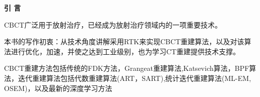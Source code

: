 
\newpage

\textbf{引 言}

CBCT广泛用于放射治疗，已经成为放射治疗领域内的一项重要技术。

本书的写作初衷：从技术角度讲解采用RTK来实现CBCT重建算法，以及对该算法进行优化，加速，并使之达到工业级别，也为学习CT重建提供技术支撑。


CBCT重建方法包括传统的FDK方法，Grangeat重建算法,Katsevich算法，BPF算法，迭代重建算法包括代数重建算法(ART，SART),统计迭代重建算法(ML-EM, OSEM)，以及最新的深度学习方法